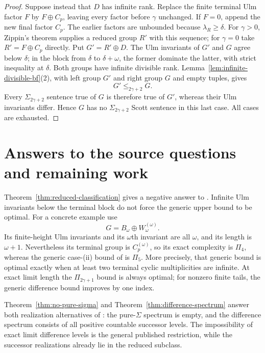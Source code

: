 \documentclass[11pt]{article}
\begin{document}
\begin{proof}
Suppose instead that $D$ has infinite rank. Replace the finite
terminal Ulm factor $F$ by $F\oplus C_p$, leaving every factor
before $\gamma$ unchanged. If $F=0$, append the new final factor
$C_p$. The earlier factors are unbounded because
$\lambda_R\ge\delta$. For $\gamma>0$, Zippin's theorem supplies a reduced
group $R'$ with this sequence; for $\gamma=0$ take $R'=F\oplus C_p$ directly. Put $G'=R'\oplus D$.
The Ulm invariants of $G'$ and $G$ agree below $\delta$; in the
block from $\delta$ to $\delta+\omega$, the former dominate the
latter, with strict inequality at $\delta$. Both groups have
infinite divisible rank. Lemma~\ref{lem:infinite-divisible-bf}(2),
with left group $G'$ and right group $G$ and empty tuples, gives
\[
 G'\le_{2\gamma+2}G.
\]
Every $\Sigma_{2\gamma+2}$ sentence true of $G$ is therefore true
of $G'$, whereas their Ulm invariants differ. Hence $G$ has no
$\Sigma_{2\gamma+2}$ Scott sentence in this last case.
All cases are exhausted.
\end{proof}



\section{Answers to the source questions and remaining work}
Theorem~\ref{thm:reduced-classification} gives a negative answer to
\cite[Question~5.1]{ACM}. Infinite Ulm invariants below the terminal
block do not force the generic upper bound to be optimal. For a concrete
example use
\[
 G=B_\omega\oplus W_\omega^{(\omega)}.
\]
Its finite-height Ulm invariants and its $\omega$th invariant are all
$\omega$, and its length is $\omega+1$. Nevertheless its terminal group
is $C_p^{(\omega)}$, so its exact complexity is $\Pi_4$, whereas the
generic case-(ii) bound of \cite[Theorem~3.1]{ACM} is $\Pi_5$.
More precisely, that generic bound is optimal exactly when at least two
terminal cyclic multiplicities are infinite. At exact limit length
the $\Pi_{2\gamma+1}$ bound is always optimal; for nonzero finite tails,
the generic difference bound improves by one index.

Theorem~\ref{thm:no-pure-sigma} and
Theorem~\ref{thm:difference-spectrum} answer both realization alternatives
of \cite[Question~5.2]{ACM}: the pure-$\Sigma$ spectrum is empty, and the
difference spectrum consists of all positive countable successor levels.
The impossibility of exact limit difference levels is the general
published restriction, while the successor realizations already lie in
the reduced subclass.
\end{document}
